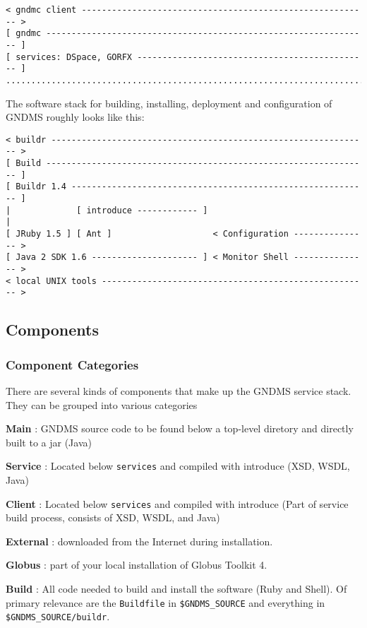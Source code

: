 \documentclass{article}
\begin{document}
\begin{verbatim}
< gndmc client --------------------------------------------------------- >
[ gndmc ---------------------------------------------------------------- ]
[ services: DSpace, GORFX ---------------------------------------------- ]    
..........................................................................
\end{verbatim}
The software stack for building, installing, deployment and
configuration of GNDMS roughly looks like this:

\begin{verbatim}
< buildr --------------------------------------------------------------- >
[ Build ---------------------------------------------------------------- ]
[ Buildr 1.4 ----------------------------------------------------------- ] 
|             [ introduce ------------ ]                                 |
[ JRuby 1.5 ] [ Ant ]                    < Configuration --------------- >    
[ Java 2 SDK 1.6 --------------------- ] < Monitor Shell --------------- >
< local UNIX tools ----------------------------------------------------- > 
\end{verbatim}
\subsection{Components}

\subsubsection{Component Categories}

There are several kinds of components that make up the GNDMS
service stack. They can be grouped into various categories

\textbf{Main} : GNDMS source code to be found below a top-level
diretory and directly built to a jar (Java)

\textbf{Service} : Located below \verb!services! and compiled with
introduce (XSD, WSDL, Java)

\textbf{Client} : Located below \verb!services! and compiled with
introduce (Part of service build process, consists of XSD, WSDL,
and Java)

\textbf{External} : downloaded from the Internet during
installation.

\textbf{Globus} : part of your local installation of Globus Toolkit
4.

\textbf{Build} : All code needed to build and install the software
(Ruby and Shell). Of primary relevance are the \verb!Buildfile! in
\verb!$GNDMS_SOURCE! and everything in
\verb!$GNDMS_SOURCE/buildr!.
\end{document}
